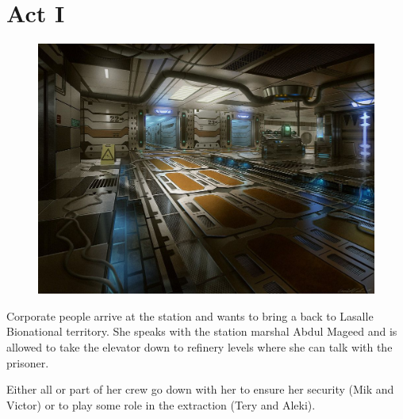 \chapter{Act I}



\begin{figure}
    \centering
    \includegraphics[width=1.0\textwidth]{img/bg/interior.jpg}
\end{figure}



\begin{rpg-commentbox}{}

    Corporate people arrive at the station and  wants to bring a  back to Lasalle Bionational territory. She speaks with the station marshal Abdul Mageed and is allowed to take the elevator down to refinery levels where she can talk with the prisoner.

    Either all or part of her crew go down with her to ensure her security (Mik and Victor) or to play some role in the extraction (Tery and Aleki). 
    
\end{rpg-commentbox}




